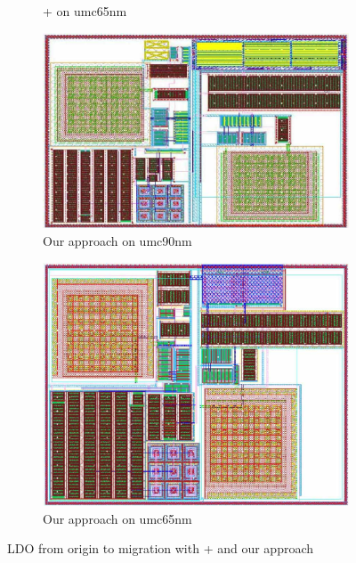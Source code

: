 \begin{figure}[ht]
\begin{subfigure}[t]{0.4\textwidth}
        \caption{\cite{msc-bhattacharya-tcad06}+\cite{Chin_DMR_ICCAD2013} on umc65nm }\label{subfig:LDO_umc65_PlFuRtCDT}
        \end{subfigure}
        \begin{subfigure}[t]{0.4\textwidth}
        \includegraphics[width=\textwidth]{Fig/LDO_umc90_PlFxRtCDT.eps}
        \caption{Our approach on umc90nm }\label{subfig:LDO_umc90_PlFxRtCDT}
        \end{subfigure}
        \begin{subfigure}[t]{0.4\textwidth}
        \includegraphics[width=\textwidth]{Fig/LDO_umc65_PlFxRtCDT.eps}
        \caption{Our approach on umc65nm }\label{subfig:LDO_umc65_PlFxRtCDT}  
        \end{subfigure}
      \caption{LDO from origin to migration with \cite{msc-bhattacharya-tcad06}+\cite{Chin_DMR_ICCAD2013} and our approach}\label{fig:LDO}
      \end{figure}


